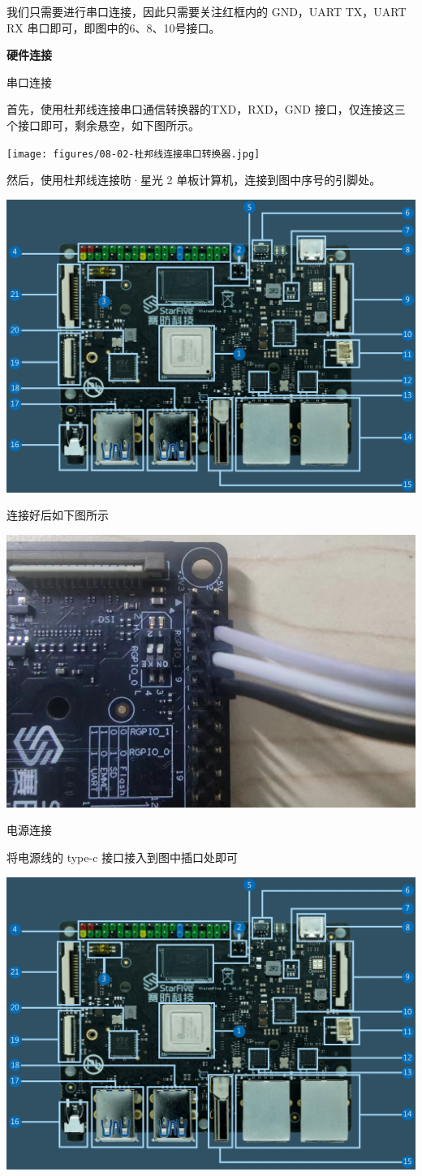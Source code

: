 我们只需要进行串口连接，因此只需要关注红框内的 GND，UART TX，UART RX 串口即可，即图中的6、8、10号接口。

\textbf{硬件连接}

{
	 串口连接
	
	\raggedright
	\setlength{\parindent}{2em}
	首先，使用杜邦线连接串口通信转换器的TXD，RXD，GND 接口，仅连接这三个接口即可，剩余悬空，如下图所示。
	
	\centering
	\texttt{[image: figures/08-02-杜邦线连接串口转换器.jpg]}
	
	\raggedright
	\setlength{\parindent}{2em}
	
	然后，使用杜邦线连接昉·星光 2 单板计算机，连接到图中序号的引脚处。
	
	
	\centering
	\includegraphics[width=0.58\linewidth]{figures/08-02-赛昉结构.jpg}
	
	\raggedright
	\setlength{\parindent}{2em}
	
	连接好后如下图所示
	
	\centering
	\includegraphics[width=0.58\linewidth]{figures/08-02-杜邦线连接赛昉.jpg}
	
	\raggedright
	\setlength{\parindent}{2em}
	
	 电源连接
	
	将电源线的 type-c 接口接入到图中插口处即可
	
	\centering
	\includegraphics[width=0.58\linewidth]{figures/08-02-赛昉结构.jpg}
	
}
